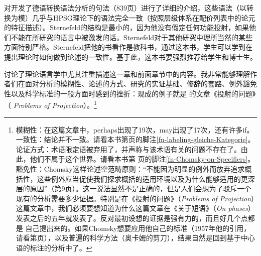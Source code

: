 { 对开发了德语转换语法分析的句法（839页）进行了详细的介绍，这些语法（以转换为模）几乎与HPSG理论下的语法完全一致（按照层级体系在配价列表中的论元的特征描述）。Sternefeld的结构是最小的，因为他没有假定任何功能投射，如果他们不能在所研究的语言中被激发的话。Sternefeld对于其他研究中理所当然的某些方面特别严格。Sternefeld把他的书看作是教科书，通过这本书，学生可以学到在提出理论时如何做到论述的一致性。基于此，这本书要强烈推荐给学生和博士生。

 \citet{SR2012a}讨论了理论语言学中尤其注重描述这一章和前面章节中的内容。我非常能够理解作者们在面对分析的模糊性、论述的方式、研究的实证基础、修辞的套路、例外豁免性以及科学标准的一般方面时感到的挫折：现成的例子就是 \citet{Chomsky2013a}的文章《投射的问题》（ \emph{Problems of Projection}）。\footnote{%
  模糊性：在这篇文章中，perhaps出现了19次，may出现了17次，还有许多if。一致性：结论并不一致。请看本书第\pageref{fn-labeling-gleiche-Kategorie}页的脚注\ref{fn-labeling-gleiche-Kategorie}。论证方式：术语限定语被弃用了，并声称与该术语有关的问题不存在了。由此，他们不属于这个世界。请看本书第\pageref{fn-Chomsky-on-Specifiers}
  页的脚注\ref{fn-Chomsky-on-Specifiers}。豁免性：Chomsky这样论述空范畴原则：“不能因为明显的例外而放弃追求概括性，这些例外应当促使我们探求概括的适用环境以及为什么能够适用的更深层的原因”（第9页）。这一说法显然不是正确的，但是人们会想为了驳斥一个现有的分析需要多少证据。特别是在《投射的问题》（\emph{Problems of Projection}）这篇文章中，我们必须要想知道为什么这篇文章在《关于短语》（\emph{On phases}）发表之后的五年就发表了。反对最初设想的证据是强有力的，而且好几个点都是 \citet{Chomsky2013a}自己提出来的。如果Chomsky想要应用他自己的标准（1957年他的引用，请看第\pageref{quote-Chomsky-Formalisierung}页），以及普遍的科学方法（奥卡姆的剪刀），结果自然是回到基于中心语的标注的分析中了。
  
}}
